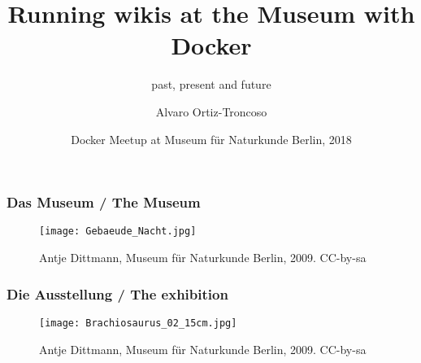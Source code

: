 \documentclass[13pt]{beamer}
\title
{Running wikis at the Museum with Docker}
\subtitle{past, present and future}
\author
{Alvaro Ortiz-Troncoso}
\date
{Docker Meetup at Museum für Naturkunde Berlin, 2018}
\begin{document}
{
  \frame{\titlepage}
}

\begin{frame}
  \frametitle{Das Museum / \textcolor{mfn_green}{The Museum}}
  \begin{figure}
    \texttt{[image: Gebaeude\_Nacht.jpg]}
    \caption{\textcopyright Antje Dittmann, Museum für Naturkunde Berlin, 2009. CC-by-sa}
  \end{figure}
\end{frame}

\begin{frame}
  \frametitle{Die Ausstellung / \textcolor{mfn_green}{The exhibition}}
  \begin{figure}
  \texttt{[image: Brachiosaurus\_02\_15cm.jpg]}
  \caption{\textcopyright Antje Dittmann, Museum für Naturkunde Berlin, 2009. CC-by-sa}
  \end{figure}
\end{frame}
\end{document}
